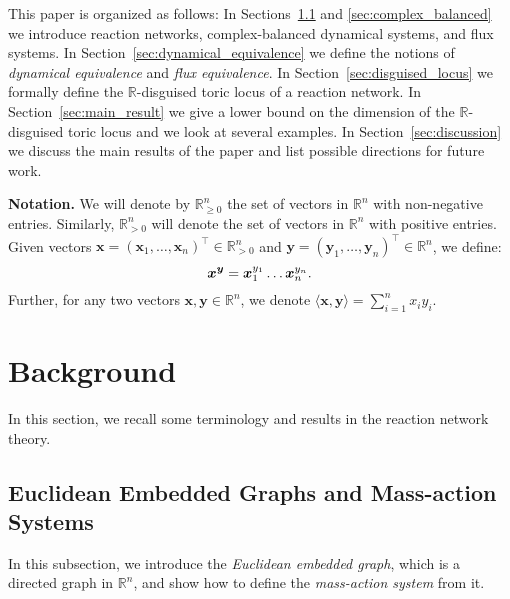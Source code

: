 \documentclass[11pt]{article}
\theoremstyle{plain}
\theoremstyle{definition}
\theoremstyle{remark}
\newcommand\RR{\mathbb{R}}
\newcommand\by{\boldsymbol{y}}
\newcommand\bx{\boldsymbol{x}}
\begin{document}

This paper is organized as follows: 
In Sections~\ref{sec:reaction_network} and \ref{sec:complex_balanced} we introduce reaction networks, complex-balanced dynamical systems, and flux systems. In Section~\ref{sec:dynamical_equivalence} we define the notions of \emph{dynamical equivalence} and \emph{flux equivalence}. In Section~\ref{sec:disguised_locus} we formally define the  $\RR$-disguised toric locus of a reaction network. In Section~\ref{sec:main_result} we give a lower bound on the dimension of the  $\RR$-disguised toric locus and we look at several examples. In Section~\ref{sec:discussion} we discuss the main results of the paper and list possible directions for future work.

\medskip

\textbf{Notation.}
We will denote by $\mathbb{R}_{\geq 0}^n$ the set of vectors in $\mathbb{R}^n$ with non-negative entries. Similarly,  $\mathbb{R}_{>0}^n$ will denote the set of vectors in $\mathbb{R}^n$ with positive entries.  Given vectors $\bx = (\bx_1, \ldots, \bx_n)^{\intercal}\in \RR^n_{>0}$ and $\by = (\by_1, \ldots, \by_n)^{\intercal} \in \RR^n$, we define:
\begin{equation} \notag
\bx^{\by} = \bx_1^{y_{1}} \ldots \bx_n^{y_{n}}.
\end{equation}
Further, for any two vectors $\bx, \by \in \RR^n$, we denote $\langle \bx, \by \rangle = \sum\limits^{n}_{i=1} x_i y_i$.


\section{Background}
\label{sec:background}


In this section, we recall some terminology and results in the reaction network theory.

\subsection{Euclidean Embedded Graphs and Mass-action Systems}
\label{sec:reaction_network}

In this subsection, we introduce the \emph{Euclidean embedded graph}, which is a directed graph in $\RR^n$,
and show how to define the \emph{mass-action system} from it.
\end{document}
